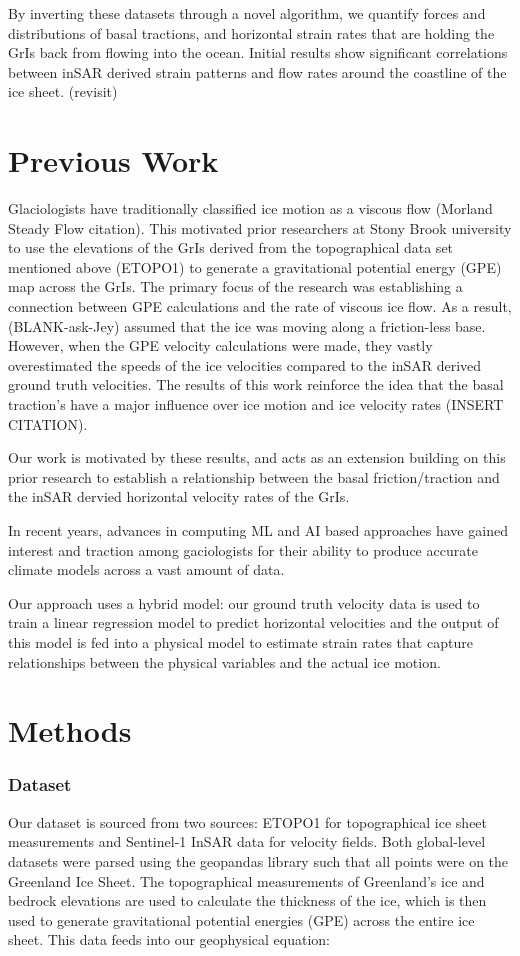 \documentclass{article}
\begin{document}
By inverting these datasets through a novel algorithm, we quantify forces and distributions of basal tractions, and horizontal strain rates that are holding the GrIs back from flowing into the ocean. Initial results show significant correlations between inSAR derived strain patterns and flow rates around the coastline of the ice sheet. (revisit)

\section{Previous Work}

Glaciologists have traditionally classified ice motion as a viscous flow (Morland Steady Flow citation). This motivated prior researchers at Stony Brook university to use the elevations of the GrIs derived from the topographical data set mentioned above (ETOPO1) to generate a gravitational potential energy (GPE) map across the GrIs. The primary focus of the research was establishing a connection between GPE calculations and the rate of viscous ice flow. As a result, (BLANK-ask-Jey) assumed that the ice was moving along a friction-less base. However, when the GPE velocity calculations were made, they vastly overestimated the speeds of the ice velocities compared to the inSAR derived ground truth velocities. The results of this work reinforce the idea that the basal traction's have a major influence over ice motion and ice velocity rates (INSERT CITATION). 

Our work is motivated by these results, and acts as an extension building on this prior research to establish a relationship between the basal friction/traction and the inSAR dervied horizontal velocity rates of the GrIs. 

In recent years, advances in computing ML and AI based approaches have gained interest and traction among gaciologists for their ability to produce accurate climate models across a vast amount of data.

Our approach uses a hybrid model: our ground truth velocity data is used to train a linear regression model to predict horizontal velocities and the output of this model is fed into a physical model to estimate strain rates that capture relationships between the physical variables and the actual ice motion.

\section{Methods}

\subsubsection{Dataset}
Our dataset is sourced from two sources: ETOPO1 for topographical ice sheet measurements and Sentinel-1 InSAR data for velocity fields. Both global-level datasets were parsed using the geopandas library such that all points were on the Greenland Ice Sheet. The topographical measurements of Greenland’s ice and bedrock elevations are used to calculate the thickness of the ice, which is then used to generate gravitational potential energies (GPE) across the entire ice sheet. This data feeds into our geophysical equation:
\end{document}
